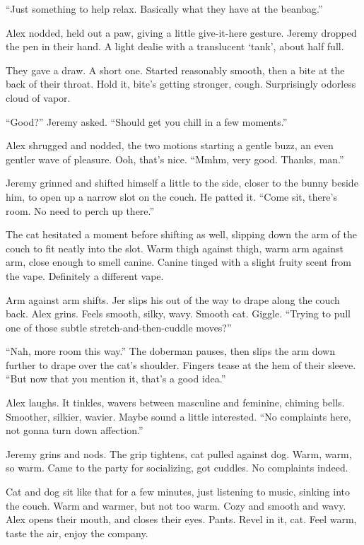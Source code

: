 \documentclass[12pt,letterpaper,oneside]{memoir}
\begin{document}
  ``Just something to help relax. Basically what they have at the
  beanbag.''

  Alex nodded, held out a paw, giving a little give-it-here gesture.
  Jeremy dropped the pen in their hand. A light dealie with a translucent
  `tank', about half full.

  They gave a draw. A short one. Started reasonably smooth, then a bite at
  the back of their throat. Hold it, bite's getting stronger, cough.
  Surprisingly odorless cloud of vapor.

  ``Good?'' Jeremy asked. ``Should get you chill in a few moments.''

  Alex shrugged and nodded, the two motions starting a gentle buzz, an
  even gentler wave of pleasure. Ooh, that's nice. ``Mmhm, very good.
  Thanks, man.''

  Jeremy grinned and shifted himself a little to the side, closer to the
  bunny beside him, to open up a narrow slot on the couch. He patted it.
  ``Come sit, there's room. No need to perch up there.''

  The cat hesitated a moment before shifting as well, slipping down the
  arm of the couch to fit neatly into the slot. Warm thigh against thigh,
  warm arm against arm, close enough to smell canine. Canine tinged with a
  slight fruity scent from the vape. Definitely a different vape.

  Arm against arm shifts. Jer slips his out of the way to drape along the
  couch back. Alex grins. Feels smooth, silky, wavy. Smooth cat. Giggle.
  ``Trying to pull one of those subtle stretch-and-then-cuddle moves?''

  ``Nah, more room this way.'' The doberman pauses, then slips the arm
  down further to drape over the cat's shoulder. Fingers tease at the hem
  of their sleeve. ``But now that you mention it, that's a good idea.''

  Alex laughs. It tinkles, wavers between masculine and feminine, chiming
  bells. Smoother, silkier, wavier. Maybe sound a little interested. ``No
  complaints here, not gonna turn down affection.''

  Jeremy grins and nods. The grip tightens, cat pulled against dog. Warm,
  warm, so warm. Came to the party for socializing, got cuddles. No
  complaints indeed.

  Cat and dog sit like that for a few minutes, just listening to music,
  sinking into the couch. Warm and warmer, but not too warm. Cozy and
  smooth and wavy. Alex opens their mouth, and closes their eyes. Pants.
  Revel in it, cat. Feel warm, taste the air, enjoy the company.
\end{document}
